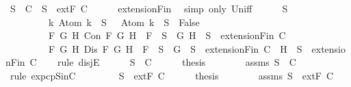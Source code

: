 \begin{isabellebody}
\ {\isachardoublequoteopen}S\ {\isasymin}\ C\ {\isasymor}\ S\ {\isasymin}\ {\isacharparenleft}extF\ C{\isacharparenright}{\isachardoublequoteclose}\isanewline
\ \ \ \ \isamarkupfalse%
\ extensionFin\ \isamarkupfalse%
\ {\isacharparenleft}simp\ only{\isacharcolon}\ Un{\isacharunderscore}iff{\isacharparenright}\isanewline
\ \ \isamarkupfalse%
\ {\isachardoublequoteopen}{\isasymbottom}\ {\isasymnotin}\ S\ {\isasymand}\isanewline
\ \ \ \ \ \ \ \ \ {\isacharparenleft}{\isasymforall}k{\isachardot}\ Atom\ k\ {\isasymin}\ S\ {\isasymlongrightarrow}\ \isactrlbold {\isasymnot}\ {\isacharparenleft}Atom\ k{\isacharparenright}\ {\isasymin}\ S\ {\isasymlongrightarrow}\ False{\isacharparenright}\ {\isasymand}\isanewline
\ \ \ \ \ \ \ \ \ {\isacharparenleft}{\isasymforall}F\ G\ H{\isachardot}\ Con\ F\ G\ H\ {\isasymlongrightarrow}\ F\ {\isasymin}\ S\ {\isasymlongrightarrow}\ {\isacharbraceleft}G{\isacharcomma}\ H{\isacharbraceright}\ {\isasymunion}\ S\ {\isasymin}\ {\isacharparenleft}extensionFin\ C{\isacharparenright}{\isacharparenright}\ {\isasymand}\isanewline
\ \ \ \ \ \ \ \ \ {\isacharparenleft}{\isasymforall}F\ G\ H{\isachardot}\ Dis\ F\ G\ H\ {\isasymlongrightarrow}\ F\ {\isasymin}\ S\ {\isasymlongrightarrow}\ {\isacharbraceleft}G{\isacharbraceright}\ {\isasymunion}\ S\ {\isasymin}\ {\isacharparenleft}extensionFin\ C{\isacharparenright}\ {\isasymor}\ {\isacharbraceleft}H{\isacharbraceright}\ {\isasymunion}\ S\ {\isasymin}\ {\isacharparenleft}extensionFin\ C{\isacharparenright}{\isacharparenright}{\isachardoublequoteclose}\isanewline
\ \ \isamarkupfalse%
\ {\isacharparenleft}rule\ disjE{\isacharparenright}\isanewline
\ \ \ \ \isamarkupfalse%
\ {\isachardoublequoteopen}S\ {\isasymin}\ C{\isachardoublequoteclose}\isanewline
\ \ \ \ \isamarkupfalse%
\ {\isacharquery}thesis\isanewline
\ \ \ \ \ \ \isamarkupfalse%
\ assms\ {\isacartoucheopen}S\ {\isasymin}\ C{\isacartoucheclose}\ \isamarkupfalse%
\ {\isacharparenleft}rule\ ex{}{\isacharunderscore}pcp{\isacharunderscore}SinC{\isacharparenright}\isanewline
\ \ \isamarkupfalse%
\isanewline
\ \ \ \ \isamarkupfalse%
\ {\isachardoublequoteopen}S\ {\isasymin}\ {\isacharparenleft}extF\ C{\isacharparenright}{\isachardoublequoteclose}\isanewline
\ \ \ \ \isamarkupfalse%
\ {\isacharquery}thesis\isanewline
\ \ \ \ \ \ \isamarkupfalse%
\ assms\ {\isacartoucheopen}S\ {\isasymin}\ {\isacharparenleft}extF\ C{\isacharparenright}{\isacartoucheclose}\ \isamarkupfalse%

\end{isabellebody}
